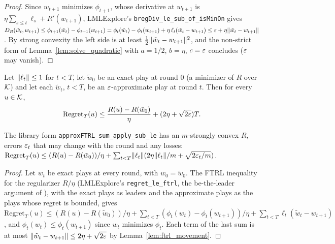 \begin{proof}
  \leanok
  Since $w_{t+1}$ minimizes $\phi_{t+1}$, whose derivative at $w_{t+1}$ is $\eta\sum_{s \le
  t}\ell_s + R'(w_{t+1})$, LMLExplore's \texttt{bregDiv\_le\_sub\_of\_isMinOn} gives
  $D_R(\tilde w_t, w_{t+1}) \le \phi_{t+1}(\tilde w_t) - \phi_{t+1}(w_{t+1})
  = \phi_t(\tilde w_t) - \phi_t(w_{t+1}) + \eta\,\ell_t(\tilde w_t - w_{t+1})
  \le \varepsilon + \eta \lVert \tilde w_t - w_{t+1} \rVert$. By strong convexity the left side is at least
  $\frac12\lVert \tilde w_t - w_{t+1} \rVert^2$, and the non-strict form of
  Lemma~\ref{lem:solve_quadratic} with $a = 1/2$, $b = \eta$, $c = \varepsilon$ concludes ($\varepsilon$ may
  vanish).
\end{proof}

\begin{theorem}
  \label{thm:approx_ftrl}
  \leanok
  Let $\lVert \ell_t \rVert \le 1$ for $t < T$, let $\tilde w_0$ be an exact play at round $0$ (a minimizer
  of $R$ over $\mathcal{K}$) and let each $\tilde w_t$, $t < T$, be an $\varepsilon$-approximate play at round $t$.
  Then for every $u \in \mathcal{K}$,
  \[ \mathrm{Regret}_T(u) \le \frac{R(u) - R(\tilde w_0)}{\eta} + (2 \eta + \sqrt{2\varepsilon}) T. \]

  The library form \texttt{approxFTRL\_sum\_apply\_sub\_le} has an $m$-strongly convex $R$, errors
  $\varepsilon_t$ that may change with the round and any losses:
  $\mathrm{Regret}_T(u) \le (R(u) - R(\tilde w_0))/\eta +
  \sum_{t<T}\lVert \ell_t \rVert(2\eta\lVert \ell_t \rVert/m + \sqrt{2\varepsilon_t/m})$.
\end{theorem}

\begin{proof}
  \leanok
  Let $w_t$ be exact plays at every round, with $w_0 = \tilde w_0$. The FTRL inequality for the
  regularizer $R/\eta$ (LMLExplore's \texttt{regret\_le\_ftrl}, the be-the-leader argument of
  \cite[Lemma 50]{SSKM26}), with the exact plays as leaders and the approximate plays as the
  plays whose regret is bounded, gives $\mathrm{Regret}_T(u) \le (R(u) - R(\tilde w_0))/\eta +
  \sum_{t<T}(\phi_t(w_t) - \phi_t(w_{t+1}))/\eta + \sum_{t<T}\ell_t(\tilde w_t - w_{t+1})$, and
  $\phi_t(w_t) \le \phi_t(w_{t+1})$ since $w_t$ minimizes $\phi_t$. Each term of the last sum is
  at most $\lVert \tilde w_t - w_{t+1} \rVert \le 2\eta + \sqrt{2\varepsilon}$ by Lemma~\ref{lem:ftrl_movement}.
\end{proof}
